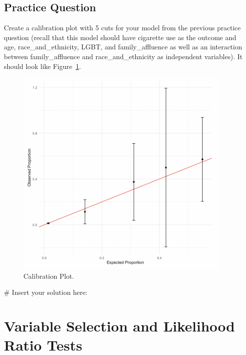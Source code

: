 \documentclass[
  letterpaper,
]{krantz}
\makeatletter
\newenvironment{Shaded}{\begin{snugshade}}{\end{snugshade}}
\newcommand{\CommentTok}[1]{\textcolor[rgb]{0.37,0.37,0.37}{#1}}
\newenvironment{kframe}{%
\medskip{}
\setlength{\fboxsep}{.8em}
 \def\at@end@of@kframe{}%
 \ifinner\ifhmode%
  \def\at@end@of@kframe{\end{minipage}}%
  \begin{minipage}{\columnwidth}%
 \fi\fi%
 \def\FrameCommand##1{\hskip\@totalleftmargin \hskip-\fboxsep
 \colorbox{shadecolor}{##1}\hskip-\fboxsep
     \hskip-\linewidth \hskip-\@totalleftmargin \hskip\columnwidth}%
 \MakeFramed {\advance\hsize-\width
   \@totalleftmargin\z@ \linewidth\hsize
   \@setminipage}}%
 {\par\unskip\endMakeFramed%
 \at@end@of@kframe}
\renewenvironment{Shaded}{\begin{kframe}}{\end{kframe}}
\makeatother
\begin{document}
\hypertarget{practice-question-24}{%
\subsection{Practice Question}\label{practice-question-24}}

Create a calibration plot with 5 cuts for your model from the previous
practice question (recall that this model should have cigarette use as
the outcome and age, race\_and\_ethnicity, LGBT, and family\_affluence
as well as an interaction between family\_affluence and
race\_and\_ethnicity as independent variables). It should look like
Figure~\ref{fig-pq2}.

\begin{figure}

{\centering \includegraphics[width=4.16667in,height=\textheight]{book/images/11-practicequestion2answer.png}

}

\caption{\label{fig-pq2}Calibration Plot.}

\end{figure}

\begin{Shaded}
\begin{Highlighting}[]
\CommentTok{\# Insert your solution here:}
\end{Highlighting}
\end{Shaded}

\hypertarget{variable-selection-and-likelihood-ratio-tests}{%
\section{Variable Selection and Likelihood Ratio
Tests}\label{variable-selection-and-likelihood-ratio-tests}}
\end{document}
